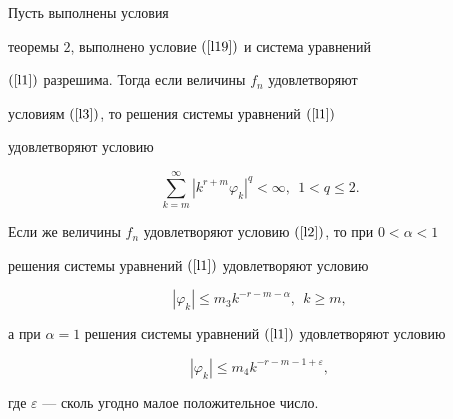 \begin{thm}


Пусть выполнены условия


теоремы $2$, выполнено условие $(\ref{l19})$ и система уравнений


$(\ref{l1})$ разрешима. Тогда если величины $f_n$ удовлетворяют


условиям $(\ref{l3})$, то решения системы уравнений $(\ref{l1})$


удовлетворяют условию


\begin{equation}


\label{l21}


\sum_{k=m}^{\infty} {|k^{r+m}\varphi_k|}^q<\infty,\ \ 1<q\leqslant 2.


\end{equation}


Если же величины $f_n$ удовлетворяют условию $(\ref{l2})$, то при $0<\alpha<1$


решения системы уравнений $(\ref{l1})$ удовлетворяют условию


\begin{equation}


\label{l22}


|\varphi_k|\leqslant m_3 k^{-r-m-\alpha}, \ \  k\geqslant m,


\end{equation}


а при $\alpha=1$ решения системы уравнений $(\ref{l1})$ удовлетворяют условию


\begin{equation}


\label{l23}


|\varphi_k|\leqslant m_4 k^{-r-m-1+\varepsilon},


\end{equation}


где $\varepsilon$ --- сколь угодно малое положительное число.


\end{thm}








